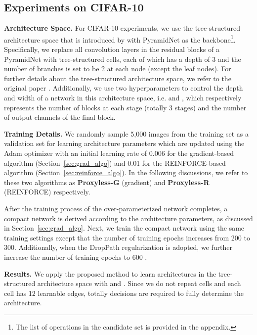 \documentclass{article} \usepackage{iclr2019_conference,times}
\newcommand{\minisection}[1]{\vspace{5pt}\noindent\textbf{#1.}}
\begin{document}
\subsection{Experiments on CIFAR-10}
\minisection{Architecture Space}
For CIFAR-10 experiments, we use the tree-structured architecture space that is introduced by \cite{cai2018path} with PyramidNet \citep{han2017deep} as the backbone\footnote{The list of operations in the candidate set is provided in the appendix.}. Specifically, we replace all  convolution layers in the residual blocks of a PyramidNet with tree-structured cells, each of which has a depth of 3 and the number of branches is set to be 2 at each node (except the leaf nodes). 
For further details about the tree-structured architecture space, we refer to the original paper \citep{cai2018path}. Additionally, we use two hyperparameters to control the depth and width of a network in this architecture space, i.e.  and , which respectively represents the number of blocks at each stage (totally 3 stages) and the number of output channels of the final block. 

\minisection{Training Details} We randomly sample 5,000 images from the training set as a validation set for learning architecture parameters which are updated using the Adam optimizer with an initial learning rate of 0.006 for the gradient-based algorithm (Section~\ref{sec:grad_algo}) and 0.01 for the REINFORCE-based algorithm (Section~\ref{sec:reinforce_algo}). In the following discussions, we refer to these two algorithms as \textbf{Proxyless-G} (gradient) and \textbf{Proxyless-R} (REINFORCE) respectively. 

After the training process of the over-parameterized network completes, a compact network is derived according to the architecture parameters, as discussed in Section~\ref{sec:grad_algo}. Next, we train the compact network using the same training settings except that the number of training epochs increases from 200 to 300. Additionally, when the DropPath regularization \citep{zoph2017learning,huang2016deep} is adopted, we further increase the number of training epochs to 600 \citep{zoph2017learning}. 

\minisection{Results} We apply the proposed method to learn architectures in the tree-structured architecture space with  and . Since we do not repeat cells and each cell has 12 learnable edges, totally  decisions are required to fully determine the architecture.
\end{document}
